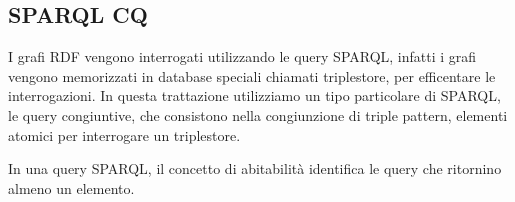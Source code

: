 
\subsection{SPARQL CQ} \label{sec:SPARQL}
\label{sec:SPARQLIntro}
I grafi RDF vengono interrogati utilizzando le query SPARQL, infatti i grafi vengono memorizzati in database speciali chiamati triplestore, per efficentare le interrogazioni. In questa trattazione utilizziamo un tipo particolare di SPARQL, le query congiuntive, che consistono nella congiunzione di triple pattern, elementi atomici per interrogare un triplestore.
\begin{definition}[Abitabilità]
	In una query SPARQL, il concetto di abitabilità identifica le query che ritornino almeno un elemento.
\end{definition}

